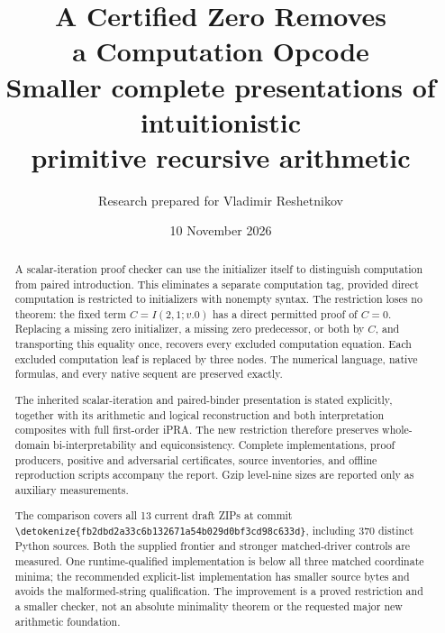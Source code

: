\documentclass[11pt,letterpaper]{article}
\title{\color{ink}\bfseries A Certified Zero Removes\\a Computation Opcode\\[8pt]
\large Smaller complete presentations of intuitionistic\\primitive recursive arithmetic}
\author{Research prepared for Vladimir Reshetnikov}
\date{10 November 2026}
\theoremstyle{definition}\newtheorem{definition}[theorem]{Definition}
\theoremstyle{remark}\newtheorem{remark}[theorem]{Remark}
\newcommand{\file}[1]{\expandafter\nolinkurl\expandafter{\detokenize{#1}}}
\begin{document}
\maketitle
\begin{abstract}
A scalar-iteration proof checker can use the initializer itself to
distinguish computation from paired introduction. This eliminates a
separate computation tag, provided direct computation is restricted to
initializers with nonempty syntax. The restriction loses no theorem:
the fixed term $C=I(2,1;v.0)$ has a direct permitted proof of $C=0$.
Replacing a missing zero initializer, a missing zero predecessor, or both
by $C$, and transporting this equality once, recovers every excluded
computation equation. Each excluded computation leaf is replaced by
three nodes. The numerical language, native formulas, and every native
sequent are preserved exactly.

The inherited scalar-iteration and paired-binder presentation is stated
explicitly, together with its arithmetic and logical reconstruction and
both interpretation composites with full first-order iPRA. The new
restriction therefore preserves whole-domain bi-interpretability and
equiconsistency. Complete implementations, proof producers, positive
and adversarial certificates, source inventories, and offline reproduction
scripts accompany the report. Gzip level-nine sizes are reported only as
auxiliary measurements.

The comparison covers all 13 current draft ZIPs at commit
\file{fb2dbd2a33c6b132671a54b029d0bf3cd98c633d}, including 370 distinct
Python sources. Both the supplied frontier and stronger matched-driver
controls are measured. One runtime-qualified implementation is below
all three matched coordinate minima; the recommended explicit-list
implementation has smaller source bytes and avoids the malformed-string
qualification. The improvement is a proved restriction and a smaller
checker, not an absolute minimality theorem or the requested major new
arithmetic foundation.
\end{abstract}
\begin{center}
\end{center}
\clearpage
\setcounter{tocdepth}{1}
\hypersetup{bookmarksdepth=2}
\begingroup\small\setlength{\parskip}{0pt}\tableofcontents\endgroup
\clearpage
\end{document}
